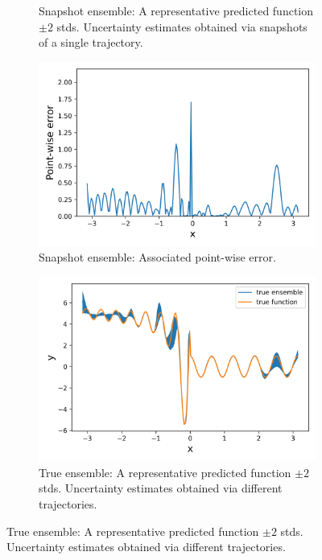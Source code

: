 \begin{figure}[H]
\begin{subfigure}[b]{.45\textwidth}
		\caption{Snapshot ensemble: A representative predicted function $\pm 2$ stds.
		Uncertainty estimates obtained via snapshots of a single trajectory.}
	\end{subfigure}
	\begin{subfigure}[b]{.45\textwidth}
		\centering
		\includegraphics[width=1\linewidth]{./figs/snap_rep_err.png}  
		\caption{Snapshot ensemble: Associated point-wise error. \newline \newline}
	\end{subfigure}
	\begin{subfigure}[b]{.45\textwidth}
		\centering
		\includegraphics[width=1\linewidth]{./figs/ens_rep_fun.png}  
		\caption{True ensemble: A representative predicted function $\pm 2$ stds.
		Uncertainty estimates obtained via different trajectories.}
	\end{subfigure}

\end{figure}
